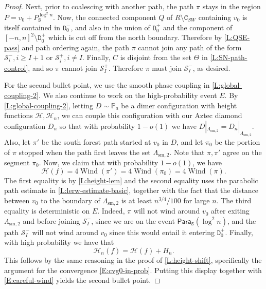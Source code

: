 \documentclass[11pt,twoside]{amsart}
\theoremstyle{plain}
\numberwithin{quest}{section}
\theoremstyle{remark}
\numberwithin{rem}{section}
\theoremstyle{definition}
\renewcommand{\P}{\mathbb{P}}
\newcommand{\cS}{\mathcal{S}}
\newcommand{\cH}{\mathcal{H}}
\renewcommand{\tt}[1]{{\mathtt{#1}}}
\begin{document}
\begin{proof}
		Next, prior to coalescing with another path, the path $\pi$ stays in the region $P = v_0 + P^{\log^2 n}_\tt{S}$. Now, the connected component $Q$ of $R \setminus\tt{C}_{SW}$ containing $v_0$ is itself contained in $\tt{D}_0^-$, and also in the union of $\tt{D}_0^+$ and the component of $[-n, n]^2 \setminus \tt{D}_0^+$ which is cut off from the north boundary.
		Therefore by \cref{L:QSE-pass} and path ordering again, the path $\pi$ cannot join any path of the form $\cS_i^-, i \ge I +1$ or $\cS_i^+, i \ne I$. Finally, $C$ is disjoint from the set $\Theta$ in \cref{L:SN-path-control}, and so $\pi$ cannot join $\cS_I^+$. Therefore $\pi$ must join $\cS_I^-$, as desired.
		
		For the second bullet point, we use the smooth phase coupling in \cref{L:global-coupling-2}. We also continue to work on the high-probability event $E$. By \cref{L:global-coupling-2}, letting $D \sim \P_a$ be a dimer configuration with height functions $\cH, \cH_n$, we can couple this configuration with our Aztec diamond configuration $D_n$ so that with probability $1 - o(1)$ we have $D|_{\Lambda_{\mathrm{sm},2}} = D_n|_{\Lambda_{\mathrm{sm},2}}$. Also, let $\pi'$ be the south forest path started at $v_0$ in $D$, and let $\pi_0$ be the portion of $\pi$ stopped when the path first leaves the set $\Lambda_{\mathrm{sm},2}$. Note that $\pi, \pi'$ agree on the segment $\pi_0$. Now, we claim that with probability $1 - o(1)$, we have
		\begin{equation}
			\label{E:careful-wind}
\cH(f) = 4\operatorname{Wind}(\pi') = 4\operatorname{Wind}(\pi_0) = 4\operatorname{Wind}(\pi).
		\end{equation}
		The first equality is by \cref{L:height-lem} and the second equality uses the parabolic path estimate in \cref{L:lerw-estimate-basic}, together with the fact that the distance between $v_0$ to the boundary of $\Lambda_{\mathrm{sm},2}$ is at least $n^{3/4}/100$ for large $n$. The third equality is deterministic on $E$. Indeed, $\pi$ will not wind around $v_0$ after exiting $\Lambda_{\mathrm{sm},2}$ and before joining $\cS_I^-$, since we are on the event $\mathsf{Para}_\tt{S}(\log^2 n)$, and the path $\cS_I^-$ will not wind around $v_0$ since this would entail it entering $\tt{D}_0^+$. Finally, with high probability we have that
		$$
		\cH_n(f) = \cH(f) + H_n.
		$$
		This follows by the same reasoning in the proof of \cref{L:height-shift}, specifically the argument for the convergence \eqref{E:cvg0-in-prob}. Putting this display together with \eqref{E:careful-wind} yields the second bullet point.
	\end{proof}
	
\end{document}
